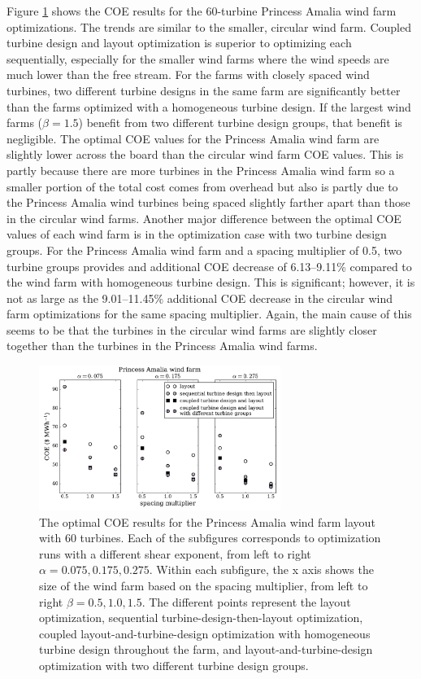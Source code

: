 \documentclass[WESD, manuscript]{copernicus}
\begin{document}
Figure \ref{amalia_results} shows the COE results for the 60-turbine Princess Amalia wind farm optimizations.  The trends are similar to the smaller, circular wind farm. Coupled turbine design and layout optimization is superior to optimizing each sequentially, especially for the smaller wind farms where the wind speeds are much lower than the free stream. For the farms with closely spaced wind turbines, two different turbine designs in the same farm are significantly better than the farms optimized with a homogeneous turbine design. If the largest wind farms ($\beta=1.5$) benefit from two different turbine design groups, that benefit is negligible. The optimal COE values for the Princess Amalia wind farm are slightly lower across the board than the circular wind farm COE values. This is partly because there are more turbines in the Princess Amalia wind farm so a smaller portion of the total cost comes from overhead but also is partly due to the Princess Amalia wind turbines being spaced slightly farther apart than those in the circular wind farms. Another major difference between the optimal COE values of each wind farm is in the optimization case with two turbine design groups. For the Princess Amalia wind farm and a spacing multiplier of 0.5, two turbine groups provides and additional COE decrease of 6.13--9.11\% compared to the wind farm with homogeneous turbine design. This is significant; however, it is not as large as the 9.01--11.45\% additional COE decrease in the circular wind farm optimizations for the same spacing multiplier. Again, the main cause of this seems to be that the turbines in the circular wind farms are slightly closer together than the turbines in the Princess Amalia wind farms.


\begin{figure}[htbp]
  \centering
  \includegraphics[width=0.7\textwidth]{Figures/amalia_results1.pdf}
  \caption{\label{amalia_results} The optimal COE results for the Princess Amalia wind farm layout with 60 turbines. Each of the subfigures corresponds to optimization runs with a different shear exponent, from left to right $\alpha=0.075,0.175,0.275$. Within each subfigure, the x axis shows the size of the wind farm based on the spacing multiplier, from left to right $\beta=0.5,1.0,1.5$. The different points represent the layout optimization, sequential turbine-design-then-layout optimization, coupled layout-and-turbine-design optimization with homogeneous turbine design throughout the farm, and layout-and-turbine-design optimization with two different turbine design groups.}
\end{figure}
\end{document}
